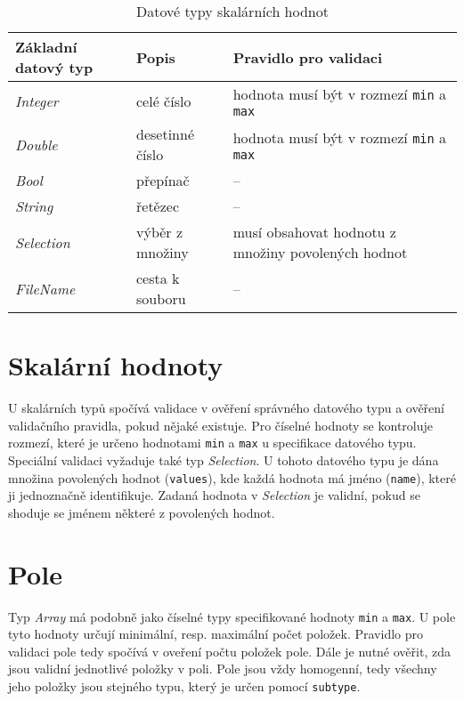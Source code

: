 \documentclass[FM,MP]{tulthesis}
\begin{document}

	\begin{table}[h]
		\centering
		\caption{Datové typy skalárních hodnot}
		\label{tab:typy-skalaru}
		\begin{tabular}{|l|l|l|}
		\hline
		\textbf{Základní datový typ} & \textbf{Popis}           & \textbf{Pravidlo pro validaci}                                            \\
		\hline
		\textit{Integer}    & celé číslo      & hodnota musí být v rozmezí \texttt{min} a \texttt{max}               \\
		\textit{Double}     & desetinné číslo & hodnota musí být v rozmezí \texttt{min} a \texttt{max}               \\
		\textit{Bool}       & přepínač        & --                                                  \\
		\textit{String}     & řetězec         & --                                                  \\
		\textit{Selection}  & výběr z množiny & \parbox[t]{7cm}{musí obsahovat hodnotu z množiny povolených hodnot} \\
		\textit{FileName}   & cesta k souboru & --                                                  \\
		\hline
		\end{tabular}
	\end{table}

	\section{Skalární hodnoty}
		U skalárních typů spočívá validace v ověření správného datového typu a ověření validačního pravidla, pokud nějaké existuje. Pro číselné hodnoty se kontroluje rozmezí, které je určeno hodnotami \texttt{min} a \texttt{max} u specifikace datového typu. Speciální validaci vyžaduje také typ \textit{Selection}. U tohoto datového typu je dána množina povolených hodnot (\texttt{values}), kde každá hodnota má jméno (\texttt{name}), které ji jednoznačně identifikuje. Zadaná hodnota v \textit{Selection} je validní, pokud se shoduje se jménem některé z povolených hodnot.

	\section{Pole}
		Typ \textit{Array} má podobně jako číselné typy specifikované hodnoty \texttt{min} a \texttt{max}. U pole tyto hodnoty určují minimální, resp. maximální počet položek. Pravidlo pro validaci pole tedy spočívá v oveření počtu položek pole. Dále je nutné ověřit, zda jsou validní jednotlivé položky v poli. Pole jsou vždy homogenní, tedy všechny jeho položky jsou stejného typu, který je určen pomocí \texttt{subtype}.
\end{document}
